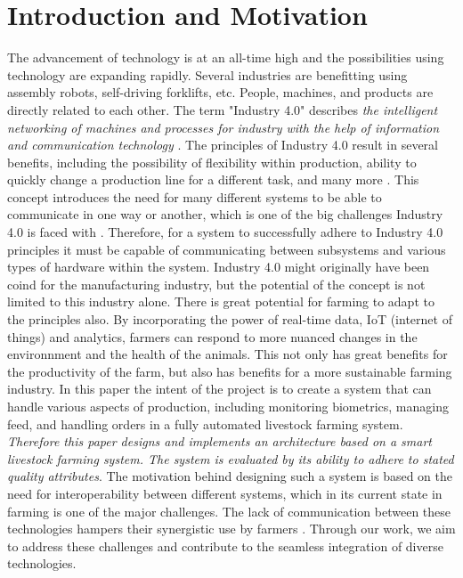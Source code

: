 \section{Introduction and Motivation}
The advancement of technology is at an all-time high and the possibilities using technology are expanding rapidly. Several industries are benefitting using assembly robots, self-driving forklifts, etc. People, machines, and products are directly related to each other. The term "Industry 4.0" describes \textit{the intelligent networking of machines and processes for industry with the help of information and communication technology} \cite{plattformindustrie40}. The principles of Industry 4.0 result in several benefits, including the possibility of flexibility within production, ability to quickly change a production line for a different task, and many more \cite{plattformindustrie40}. \vspace{2mm} \newline
This concept introduces the need for many different systems to be able to communicate in one way or another, which is one of the big challenges Industry 4.0 is faced with \cite{PANETTO2019198}. Therefore, for a system to successfully adhere to Industry 4.0 principles it must be capable of communicating between subsystems and various types of hardware within the system. \newline
Industry 4.0 might originally have been coind for the manufacturing industry, but the potential of the concept is not limited to this industry alone. There is great potential for farming to adapt to the principles also. By incorporating the power of real-time data, IoT (internet of things) and analytics, farmers can respond to more nuanced changes in the environnment and the health of the animals. This not only has great benefits for the productivity of the farm, but also has benefits for a more sustainable farming industry. \newline
In this paper the intent of the project is to create a system that can handle various aspects of production, including monitoring biometrics, managing feed, and handling orders in a fully automated livestock farming system. \vspace{2mm} \newline
\textit{Therefore this paper designs and implements an architecture based on a smart livestock farming system. The system is evaluated by its ability to adhere to stated quality attributes}.
The motivation behind designing such a system is based on the need for interoperability between different systems, which in its current state in farming is one of the major challenges. The lack of communication between these technologies hampers their synergistic use by farmers \cite{app122412844}. Through our work, we aim to address these challenges and contribute to the seamless integration of diverse technologies. \vspace{3mm}






